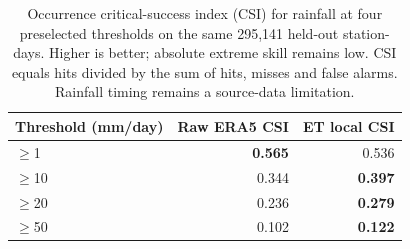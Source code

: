 \begin{table}[t]
\centering
\caption{Occurrence critical-success index (CSI) for rainfall at four preselected thresholds on the same 295,141 held-out station-days. Higher is better; absolute extreme skill remains low. CSI equals hits divided by the sum of hits, misses and false alarms. Rainfall timing remains a source-data limitation.}
\label{tab:rainfall_csi}
\begin{tabular}{lrr}
\hline
Threshold (mm/day) & Raw ERA5 CSI & ET local CSI \\
\hline
$\geq$1 & \textbf{0.565} & 0.536 \\
$\geq$10 & 0.344 & \textbf{0.397} \\
$\geq$20 & 0.236 & \textbf{0.279} \\
$\geq$50 & 0.102 & \textbf{0.122} \\
\hline
\end{tabular}
\end{table}
